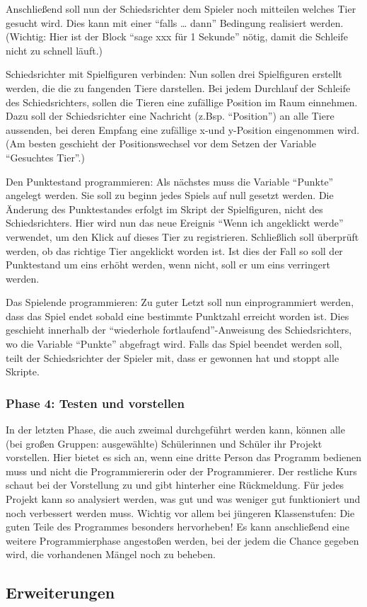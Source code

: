 Anschließend soll nun der Schiedsrichter dem Spieler noch mitteilen
welches Tier gesucht wird. Dies kann mit einer ``falls \ldots{} dann''
Bedingung realisiert werden. (Wichtig: Hier ist der Block ``sage xxx für
1 Sekunde'' nötig, damit die Schleife nicht zu schnell läuft.)

Schiedsrichter mit Spielfiguren verbinden: Nun sollen drei Spielfiguren
erstellt werden, die die zu fangenden Tiere darstellen. Bei jedem
Durchlauf der Schleife des Schiedsrichters, sollen die Tieren eine
zufällige Position im Raum einnehmen. Dazu soll der Schiedsrichter eine
Nachricht (z.Bsp. ``Position'') an alle Tiere aussenden, bei deren
Empfang eine zufällige x-und y-Position eingenommen wird. (Am besten
geschieht der Positionswechsel vor dem Setzen der Variable ``Gesuchtes
Tier''.)

Den Punktestand programmieren: Als nächstes muss die Variable ``Punkte''
angelegt werden. Sie soll zu beginn jedes Spiels auf null gesetzt
werden. Die Änderung des Punktestandes erfolgt im Skript der
Spielfiguren, nicht des Schiedsrichters. Hier wird nun das neue Ereignis
``Wenn ich angeklickt werde'' verwendet, um den Klick auf dieses Tier zu
registrieren. Schließlich soll überprüft werden, ob das richtige Tier
angeklickt worden ist. Ist dies der Fall so soll der Punktestand um eins
erhöht werden, wenn nicht, soll er um eins verringert werden.

Das Spielende programmieren: Zu guter Letzt soll nun einprogrammiert
werden, dass das Spiel endet sobald eine bestimmte Punktzahl erreicht
worden ist. Dies geschieht innerhalb der ``wiederhole
fortlaufend''-Anweisung des Schiedsrichters, wo die Variable ``Punkte''
abgefragt wird. Falls das Spiel beendet werden soll, teilt der
Schiedsrichter der Spieler mit, dass er gewonnen hat und stoppt alle
Skripte.

\subsubsection{Phase 4: Testen und vorstellen}

In der letzten Phase, die auch zweimal durchgeführt werden kann, können
alle (bei großen Gruppen: ausgewählte) Schülerinnen und Schüler ihr
Projekt vorstellen. Hier bietet es sich an, wenn eine dritte Person das
Programm bedienen muss und nicht die Programmiererin oder der
Programmierer. Der restliche Kurs schaut bei der Vorstellung zu und gibt
hinterher eine Rückmeldung. Für jedes Projekt kann so analysiert werden,
was gut und was weniger gut funktioniert und noch verbessert werden
muss. Wichtig vor allem bei jüngeren Klassenstufen: Die guten Teile des
Programmes besonders hervorheben! Es kann anschließend eine weitere
Programmierphase angestoßen werden, bei der jedem die Chance gegeben
wird, die vorhandenen Mängel noch zu beheben.

\subsection{Erweiterungen}
